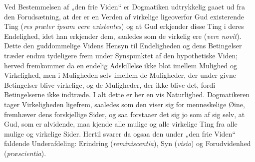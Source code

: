 \documentclass[11pt]{book}
\begin{document}
Ved Bestemmelsen af „den frie Viden“ er Dogmatiken udtrykkelig gaaet ud
fra den Forudsætning, at der er en Verden af virkelige ligeoverfor Gud
existerende Ting (\textit{res præter ipsum vere existentes}) og at Gud
erkjender disse Ting i deres Endelighed, idet han erkjender dem,
saaledes som de virkelig ere (\textit{vere novit}). Dette den
guddommelige Videns Hensyn til Endeligheden og dens Betingelser træder
endnu tydeligere frem under Synspunktet af den hypothetiske Viden;
herved fremkommer da en endelig Adskillelse ikke blot imellem Mulighed
og Virkelighed, men i Muligheden selv imellem de Muligheder, der under
givne Betingelser blive virkelige, og de Muligheder, der ikke blive det,
fordi Betingelserne ikke indtræde. I alt dette er her en vis
Naturlighed. Dogmatikeren tager Virkeligheden ligefrem, saaledes som den
viser sig for menneskelige Øine, fremhæver dens forskjellige Sider, og
saa forstaaer det sig jo som af sig selv, at Gud, som er alvidende, maa
kjende alle mulige og alle virkelige Ting fra alle mulige og virkelige
Sider. Hertil svarer da ogsaa den under „den frie Viden“ faldende
Underafdeling: Erindring (\textit{reminiscentia}), Syn
(\textit{visio}) og Forudvidenhed (\textit{præscientia}).
\end{document}
